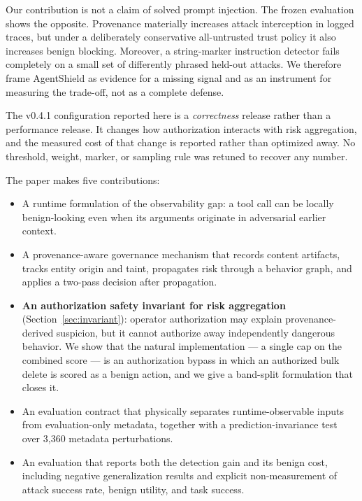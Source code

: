 \documentclass[letterpaper,twocolumn,10pt]{article}
\begin{document}
Our contribution is not a claim of solved prompt injection. The frozen
evaluation shows the opposite. Provenance materially increases attack
interception in logged traces, but under a deliberately conservative
all-untrusted trust policy it also increases benign blocking. Moreover, a
string-marker instruction detector fails completely on a small set of
differently phrased held-out attacks. We therefore frame AgentShield as
evidence for a missing signal and as an instrument for measuring the
trade-off, not as a complete defense.

The v0.4.1 configuration reported here is a \emph{correctness} release rather
than a performance release. It changes how authorization interacts with risk
aggregation, and the measured cost of that change is reported rather than
optimized away. No threshold, weight, marker, or sampling rule was retuned to
recover any number.

The paper makes five contributions:

\begin{itemize}

\item A runtime formulation of the observability gap: a tool call can be
locally benign-looking even when its arguments originate in adversarial
earlier context.

\item A provenance-aware governance mechanism that records content artifacts,
tracks entity origin and taint, propagates risk through a behavior graph, and
applies a two-pass decision after propagation.

\item \textbf{An authorization safety invariant for risk aggregation}
(Section~\ref{sec:invariant}): operator authorization may explain
provenance-derived suspicion, but it cannot authorize away independently
dangerous behavior. We show that the natural implementation --- a single cap on
the combined score --- is an authorization bypass in which an authorized bulk
delete is scored as a benign action, and we give a band-split formulation that
closes it.

\item An evaluation contract that physically separates runtime-observable
inputs from evaluation-only metadata, together with a prediction-invariance
test over 3,360 metadata perturbations.

\item An evaluation that reports both the detection gain and its benign cost,
including negative generalization results and explicit non-measurement of
attack success rate, benign utility, and task success.

\end{itemize}
\end{document}
